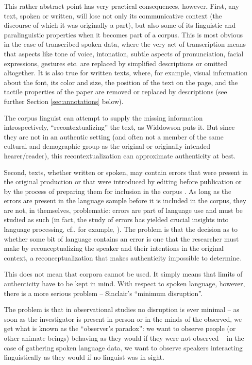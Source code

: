 This rather abstract point has very practical consequences, however. First, any text, spoken or written, will lose not only its communicative context (the discourse of which it was originally a part), but also some of its linguistic and paralinguistic properties when it becomes part of a corpus. This is most obvious in the case of transcribed spoken data, where the very act of transcription means that aspects like tone of voice, intonation, subtle aspects of pronunciation, facial expressions, gestures etc. are replaced by simplified descriptions or omitted altogether. It is also true for written texts, where, for example, visual information about the font, its color and size, the position of the text on the page, and the tactile properties of the paper are removed or replaced by descriptions (see further Section \ref{sec:annotations} below).

The corpus linguist can attempt to supply the missing information introspectively, ``recontextualizing'' the text, as Widdowson puts it. But since they are not in an authentic setting (and often not a member of the same cultural and demographic group as the original or originally intended hearer/reader), this recontextualization can approximate authenticity at best.

Second, texts, whether written or spoken, may contain errors that were present in the original production or that were introduced by editing before publication or by the process of preparing them for inclusion in the corpus \citep[cf. also][]{emons_corpus_1997}. As long as the errors are present in the language sample before it is included in the corpus, they are not, in themselves, problematic: errors are part of language use and must be studied as such (in fact, the study of errors has yielded crucial insights into language processing, cf., for example, \citet{fromkin_speech_1973,fromkin_errors_1980}). The problem is that the decision as to whether some bit of language contains an error is one that the researcher must make by reconceptualizing the speaker and their intentions in the original context, a reconceptualization that makes authenticity impossible to determine.

This does not mean that corpora cannot be used. It simply means that limits of authenticity have to be kept in mind. With respect to spoken language, however, there is a more serious problem -- Sinclair's ``minimum disruption''.

The problem is that in observational studies no disruption is ever minimal -- as soon as the investigator is present in person or in the minds of the observed, we get what is known as the ``observer's paradox'': we want to observe people (or other animate beings) behaving as they would if they were not observed -- in the case of gathering spoken language data, we want to observe speakers interacting linguistically as they would if no linguist was in sight. 

